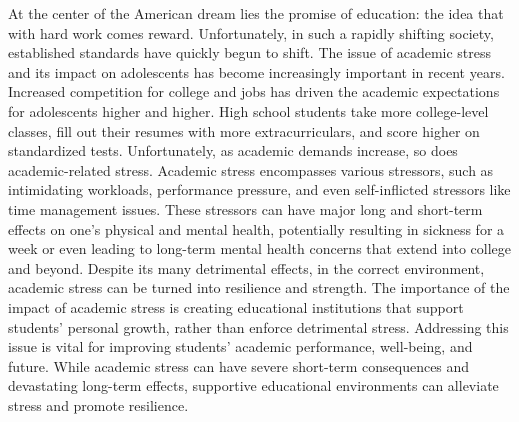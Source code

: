 


At the center of the American dream lies the promise of education: the idea that with hard work comes reward. Unfortunately, in such a rapidly shifting society, established standards have quickly begun to shift. The issue of academic stress and its impact on adolescents has become increasingly important in recent years. Increased competition for college and jobs has driven the academic expectations for adolescents higher and higher. High school students take more college-level classes, fill out their resumes with more extracurriculars, and score higher on standardized tests. Unfortunately, as academic demands increase, so does academic-related stress. Academic stress encompasses various stressors, such as intimidating workloads, performance pressure, and even self-inflicted stressors like time management issues. These stressors can have major long and short-term effects on one’s physical and mental health, potentially resulting in sickness for a week or even leading to long-term mental health concerns that extend into college and beyond. Despite its many detrimental effects, in the correct environment, academic stress can be turned into resilience and strength. The importance of the impact of academic stress is creating educational institutions that support students’ personal growth, rather than enforce detrimental stress. Addressing this issue is vital for improving students' academic performance, well-being, and future. While academic stress can have severe short-term consequences and devastating long-term effects, supportive educational environments can alleviate stress and promote resilience. 

